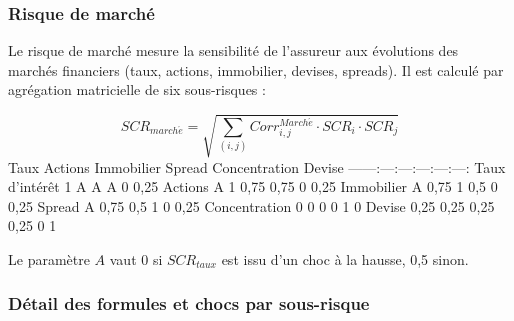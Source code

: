 \documentclass[
]{article}
\begin{document}
\subsubsection{Risque de marché}\label{risque-de-marchuxe9}

Le risque de marché mesure la sensibilité de l'assureur aux évolutions
des marchés financiers (taux, actions, immobilier, devises, spreads). Il
est calculé par agrégation matricielle de six sous-risques :

\[SCR_{march\acute{e}} = \sqrt{\sum_{(i,j)} Corr^{March\acute{e}}_{i,j} \cdot SCR_i \cdot SCR_j}\]
\textbar{} \textbar{} Taux \textbar{} Actions \textbar{} Immobilier
\textbar{} Spread \textbar{} Concentration \textbar{} Devise \textbar{}
\textbar---\textbar---:\textbar---:\textbar---:\textbar---:\textbar---:\textbar---:\textbar{}
\textbar{} Taux d'intérêt \textbar{} 1 \textbar{} A \textbar{} A
\textbar{} A \textbar{} 0 \textbar{} 0,25 \textbar{} \textbar{} Actions
\textbar{} A \textbar{} 1 \textbar{} 0,75 \textbar{} 0,75 \textbar{} 0
\textbar{} 0,25 \textbar{} \textbar{} Immobilier \textbar{} A \textbar{}
0,75 \textbar{} 1 \textbar{} 0,5 \textbar{} 0 \textbar{} 0,25 \textbar{}
\textbar{} Spread \textbar{} A \textbar{} 0,75 \textbar{} 0,5 \textbar{}
1 \textbar{} 0 \textbar{} 0,25 \textbar{} \textbar{} Concentration
\textbar{} 0 \textbar{} 0 \textbar{} 0 \textbar{} 0 \textbar{} 1
\textbar{} 0 \textbar{} \textbar{} Devise \textbar{} 0,25 \textbar{}
0,25 \textbar{} 0,25 \textbar{} 0,25 \textbar{} 0 \textbar{} 1
\textbar{}

Le paramètre \(A\) vaut 0 si \(SCR_{taux}\) est issu d'un choc à la
hausse, 0,5 sinon.

\subsubsection{Détail des formules et chocs par
sous-risque}\label{duxe9tail-des-formules-et-chocs-par-sous-risque}
\end{document}
